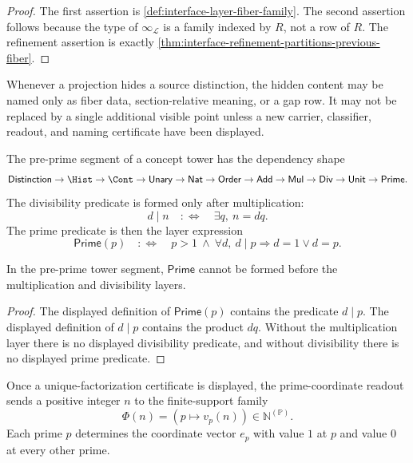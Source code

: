 \begin{proof}
The first assertion is \autoref{def:interface-layer-fiber-family}. The
second assertion follows because the type of $\infty_{\mathcal L}$ is a
family indexed by $R$, not a row of $R$. The refinement assertion is
exactly \autoref{thm:interface-refinement-partitions-previous-fiber}.
\end{proof}

\begin{principle}
\label{prin:layered-projection-no-point-replacement}
Whenever a projection hides a source distinction, the hidden content may
be named only as fiber data, section-relative meaning, or a gap row. It
may not be replaced by a single additional visible point unless a new
carrier, classifier, readout, and naming certificate have been displayed.
\end{principle}

\begin{definition}
\label{def:layered-projection-pre-prime-tower}
The pre-prime segment of a concept tower has the dependency shape
$$
\mathsf{Distinction}
\to
\Hist
\to
\Cont
\to
\mathsf{Unary}
\to
\mathsf{Nat}
\to
\mathsf{Order}
\to
\mathsf{Add}
\to
\mathsf{Mul}
\to
\mathsf{Div}
\to
\mathsf{Unit}
\to
\mathsf{Prime}.
$$
The divisibility predicate is formed only after multiplication:
$$
d\mid n
\quad:\Longleftrightarrow\quad
\exists q,\ n=dq.
$$
The prime predicate is then the layer expression
$$
\mathsf{Prime}(p)
\quad:\Longleftrightarrow\quad
p>1\ \wedge\
\forall d,\ d\mid p\Rightarrow d=1\vee d=p.
$$
\end{definition}

\begin{theorem}
\label{thm:layered-projection-prime-not-primitive}
In the pre-prime tower segment, $\mathsf{Prime}$ cannot be formed before
the multiplication and divisibility layers.
\end{theorem}

\begin{proof}
The displayed definition of $\mathsf{Prime}(p)$ contains the predicate
$d\mid p$. The displayed definition of $d\mid p$ contains the product
$dq$. Without the multiplication layer there is no displayed
divisibility predicate, and without divisibility there is no displayed
prime predicate.
\end{proof}

\begin{definition}
\label{def:layered-projection-prime-coordinate-readout}
Once a unique-factorization certificate is displayed, the prime-coordinate
readout sends a positive integer $n$ to the finite-support family
$$
\Phi(n)=(p\mapsto v_p(n))\in\mathbb N^{(\mathbb P)}.
$$
Each prime $p$ determines the coordinate vector $e_p$ with value $1$ at
$p$ and value $0$ at every other prime.
\end{definition}

